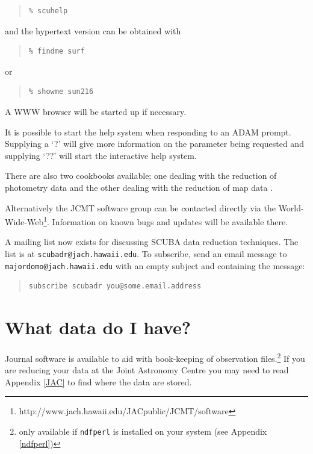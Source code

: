 \documentclass[twoside,11pt]{article}
\newenvironment{myquote}{\begin{quote}\begin{small}}{\end{small}\end{quote}}
\newcommand{\htmladdnormallinkfoot}[2]{#1\footnote{#2}}
\newcommand{\htmladdnormallink}[2]{#1}
\newcommand{\xlabel}[1]{}
\renewcommand{\_}{\texttt{\symbol{95}}}
\begin{document}
\begin{myquote}
\begin{verbatim}
% scuhelp
\end{verbatim}
\end{myquote}

and the hypertext version can be obtained with

\begin{myquote}
\begin{verbatim}
% findme surf
\end{verbatim}
\end{myquote}
or
\begin{myquote}
\begin{verbatim}
% showme sun216
\end{verbatim}
\end{myquote}
A WWW browser will be started up if necessary.

It is possible to start the help system when responding to
an ADAM prompt. Supplying a `?' will give more information on the
parameter being requested and supplying `??' will start the interactive
help system.

There are also two cookbooks available; one dealing with the reduction of
photometry data \cite{S97} and the other dealing with the reduction of
map data \cite{SANDELL97}.

Alternatively the JCMT software group can be contacted directly via the
\htmladdnormallinkfoot{World-Wide-Web}{http://www.jach.hawaii.edu/JACpublic/JCMT/software}.
Information on known bugs and updates will be available there.

A mailing list now exists for discussing SCUBA data reduction techniques.  The
list is at
\htmladdnormallink{\texttt{scubadr@jach.hawaii.edu}}{mailto:scubadr@jach.hawaii.edu}. To
subscribe, send an email message to
\htmladdnormallink{\texttt{majordomo@jach.hawaii.edu}}{mailto:majordomo@jach.hawaii.edu}
with an empty subject and containing the message:
\begin{myquote}
\begin{verbatim}
subscribe scubadr you@some.email.address
\end{verbatim}
\end{myquote}


\section{\xlabel{journal}What data do I have?\label{journal}}

Journal software is available to aid with book-keeping of observation
files.\footnote{only available if {\tt ndfperl} is installed on your system
(see Appendix \ref{ndfperl})}  If you are reducing your data at the Joint
Astronomy Centre you may need to read Appendix \ref{JAC} to find where the
data are stored.
\end{document}
